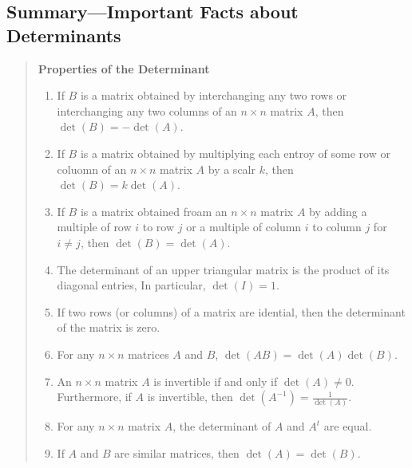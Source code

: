 \subsection{Summary---Important Facts about Determinants}
\begin{quotation}{\textbf{Properties of the Determinant}}
    \begin{enumerate}
        \item If \(B \) is a matrix obtained by interchanging any two rows or interchanging any two columns of an \( n \times n \) matrix \( A \), then \( \det(B) = - \det(A) \).
        \item If \(B\) is a matrix obtained by multiplying each entroy of some row or coluomn of an \(n \times n \) matrix \(A\) by a scalr \(k\), then \(\det(B) = k \det(A)\).
        \item If \(B\) is a matrix obtained froam an \(n \times n \) matrix \(A\) by adding a multiple of row \(i\) to row \(j\) or a multiple of column \(i\) to column \(j\) for \(i \neq j\), then \(\det(B) = \det(A)\).
        \item The determinant of an upper triangular matrix is the product of its diagonal entries, In particular, \(\det(I) = 1\).
        \item If two rows (or columns) of a matrix are idential, then the determinant of the matrix is zero.
        \item For any \(n \times n \) matrices \(A \) and \(B\), \(\det(AB) = \det(A) \det(B)\).
        \item An \(n \times n\) matrix \(A\) is invertible if and only if \(\det(A) \neq 0 \). Furthermore, if \(A\) is invertible, then \(\det(A^{-1}) = \frac{1}{\det(A)}\).
        \item For any \(n \times n \) matrix \(A\), the determinant of \(A\) and \(A^t\) are equal.
        \item If \(A\) and \(B\) are similar matrices, then \(\det(A) = \det(B)\).
    \end{enumerate}
\end{quotation}
\newpage
